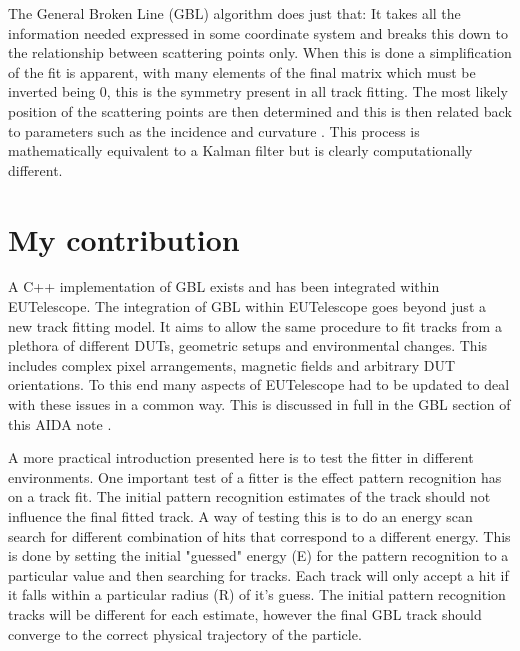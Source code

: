 The General Broken Line (GBL) algorithm does just that: It takes all the information needed expressed in some coordinate system and breaks this down to the relationship between scattering points only. When this is done a simplification of the fit is apparent, with many elements of the final matrix which must be inverted being 0, this is the symmetry present in all track fitting. The most likely position of the scattering points are then determined and this is then related back to parameters such as the incidence and curvature \cite{GBL}. This process is mathematically equivalent to a Kalman filter but is clearly computationally different. 


\section{My contribution}

A C++ implementation of GBL exists and has been integrated within EUTelescope. The integration of GBL within EUTelescope goes beyond just a new track fitting model. It aims to allow the same procedure to fit tracks from a plethora of different DUTs, geometric setups and environmental changes. This includes complex pixel arrangements, magnetic fields and arbitrary DUT orientations. To this end many aspects of EUTelescope had to be updated to deal with these issues in a common way. This is discussed in full in the GBL section of this AIDA note \cite{AIDAnote}.

A more practical introduction presented here is to test the fitter in different environments. One important test of a fitter is the effect pattern recognition has on a track fit. The initial pattern recognition estimates of the track should not influence the final fitted track. A way of testing this is to do an energy scan search for different combination of hits that correspond to a different energy. This is done by setting the initial "guessed" energy (E) for the pattern recognition to a particular value and then searching for tracks. Each track will only accept a hit if it falls within a particular radius (R) of it's guess. The initial pattern recognition tracks will be different for each estimate, however the final GBL track should converge to the correct physical trajectory of the particle. 

